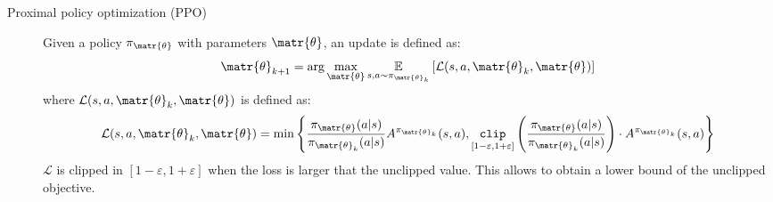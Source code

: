 \begin{description}
    \item[Proximal policy optimization (PPO)] 
        Given a policy $\pi_\matr{\theta}$ with parameters $\matr{\theta}$, an update is defined as:
        \[ \matr{\theta}_{k+1} = \arg\max_\matr{\theta} \underset{s, a \sim \pi_{\matr{\theta}_k}}{\mathbb{E}} \left[ \mathcal{L}(s, a, \matr{\theta}_k, \matr{\theta}) \right] \]
        where $\mathcal{L}(s, a, \matr{\theta}_k, \matr{\theta})$ is defined as:
        \[ 
            \mathcal{L}(s, a, \matr{\theta}_k, \matr{\theta}) = \min \left\{ 
                \frac{\pi_\matr{\theta}(a | s)}{\pi_{\matr{\theta}_k}(a | s)} A^{\pi_{\matr{\theta}_k}}(s, a),
                \underset{[1-\varepsilon, 1+\varepsilon]}{\texttt{clip}}\left( \frac{\pi_\matr{\theta}(a | s)}{\pi_{\matr{\theta}_k}(a | s)} \right) \cdot A^{\pi_{\matr{\theta}_k}}(s, a) 
            \right\}
        \]
        $\mathcal{L}$ is clipped in $[1-\varepsilon, 1+\varepsilon]$ when the loss is larger that the unclipped value. This allows to obtain a lower bound of the unclipped objective.
\end{description}